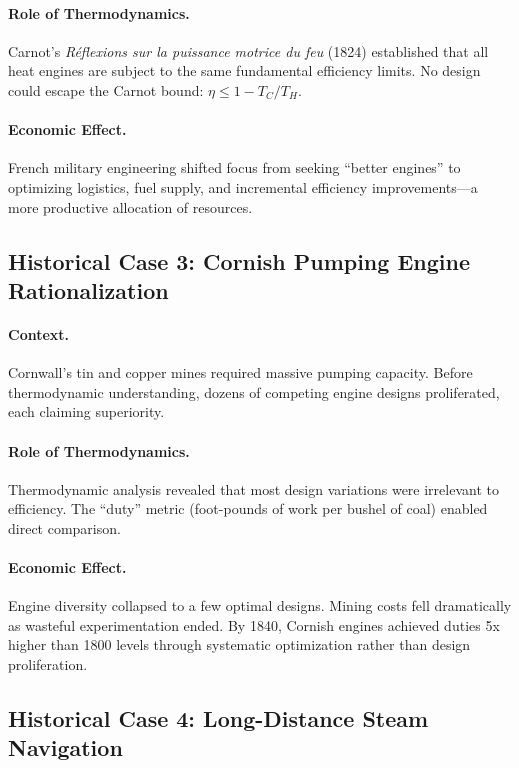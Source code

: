 \paragraph{Role of Thermodynamics.} Carnot's \textit{Réflexions sur la puissance
motrice du feu} (1824) established that all heat engines are subject to the
same fundamental efficiency limits. No design could escape the Carnot bound:
$\eta \leq 1 - T_C/T_H$.

\paragraph{Economic Effect.} French military engineering shifted focus from
seeking ``better engines'' to optimizing logistics, fuel supply, and
incremental efficiency improvements---a more productive allocation of resources.

\subsection{Historical Case 3: Cornish Pumping Engine Rationalization}

\paragraph{Context.} Cornwall's tin and copper mines required massive pumping
capacity. Before thermodynamic understanding, dozens of competing engine
designs proliferated, each claiming superiority.

\paragraph{Role of Thermodynamics.} Thermodynamic analysis revealed that most
design variations were irrelevant to efficiency. The ``duty'' metric
(foot-pounds of work per bushel of coal) enabled direct comparison.

\paragraph{Economic Effect.} Engine diversity collapsed to a few optimal
designs. Mining costs fell dramatically as wasteful experimentation ended.
By 1840, Cornish engines achieved duties 5x higher than 1800 levels through
systematic optimization rather than design proliferation.

\subsection{Historical Case 4: Long-Distance Steam Navigation}

